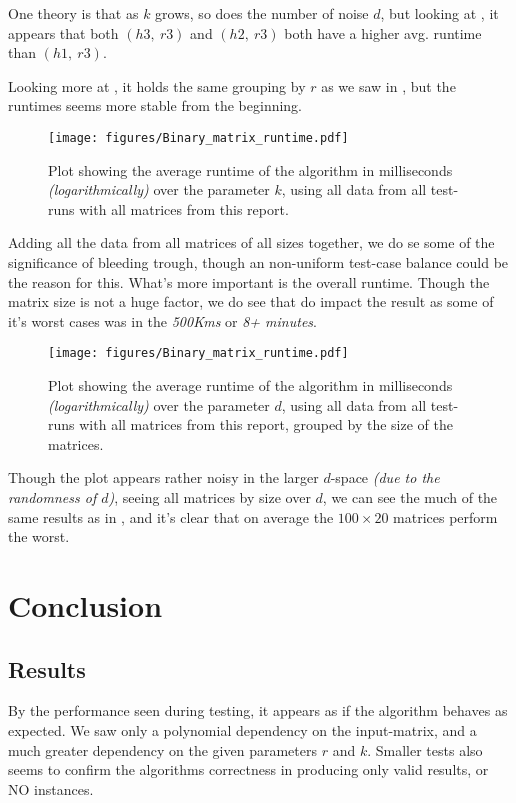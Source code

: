 \documentclass[a4paper]{article}
\begin{document}
One theory is that as $k$ grows, so does the number of noise $d$, but looking at
, it appears that both $(h3,~r3)$ and $(h2,~r3)$ both have a higher avg.
runtime than $(h1,~r3)$.

Looking more at , it holds the same grouping by $r$ as we saw in ,
but the runtimes seems more stable from the beginning.

\begin{figure}[H]
    \centering
    \texttt{[image: figures/Binary\_matrix\_runtime.pdf]}
    \caption{Plot showing the average runtime of the algorithm in milliseconds \textit{(logarithmically)}
        over the parameter $k$, using all data from all test-runs with all matrices from this report.}
    \label{fig:res-all-data}
\end{figure}

Adding all the data from all matrices of all sizes together, we do se some of the significance of 
bleeding trough, though an non-uniform test-case balance could be the reason for this. What's more important is the
overall runtime. Though the matrix size is not a huge factor, we do see that  do impact
the result as some of it's worst cases was in the \textit{500Kms} or \textit{8+ minutes}.

\begin{figure}[H]
    \centering
    \texttt{[image: figures/Binary\_matrix\_runtime.pdf]}
    \caption{Plot showing the average runtime of the algorithm in milliseconds \textit{(logarithmically)}
        over the parameter $d$, using all data from all test-runs with all matrices from this report, grouped by
        the size of the matrices.}
    \label{fig:res-all-matrices-over-d}
\end{figure}

Though the plot appears rather noisy in the larger $d$-space \textit{(due to the randomness of $d$)},
seeing all matrices by size over $d$, we can see the much of the same results as
in , and it's clear that on average the $100 \times 20$ matrices perform
the worst.

%
%

\section{Conclusion}
\subsection{Results}
By the performance seen during testing, it appears as if the algorithm behaves as expected. We saw only a polynomial
dependency on the input-matrix, and a much greater dependency on the given parameters $r$ and $k$. Smaller tests also
seems to confirm the algorithms correctness in producing only valid results, or NO instances.
\end{document}
